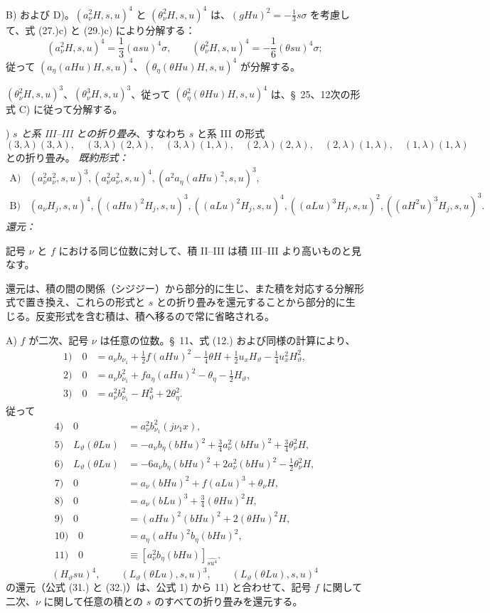 \documentclass[11pt]{jlreq}
\begin{document}
B) および D)。$(a_\nu^2H,s,u)^4$ と $(\theta_\nu^2H,s,u)^4$ は、$(gHu)^2=-\frac13s\sigma$ を考慮して、式 (27.)c) と (29.)c) により分解する：
\[
(a_\nu^2H,s,u)^4=\frac13(asu)^4\sigma,
\qquad
(\theta_\nu^2H,s,u)^4=-\frac16(\theta su)^4\sigma;
\]
従って $(a_\eta(aHu)H,s,u)^4$、$(\theta_\eta(\theta Hu)H,s,u)^4$ が分解する。

$(\theta_\nu^2H,s,u)^3$、$(\theta_\nu^3H,s,u)^3$、従って $(\theta_\eta^2(\theta Hu)H,s,u)^4$ は、\S\ 25、12次の形式 C) に従って分解する。

) \emph{$s$ と系 III--III との折り畳み}、すなわち $s$ と系 III の形式
\[
(3,\lambda)(3,\lambda),\quad (3,\lambda)(2,\lambda),\quad (3,\lambda)(1,\lambda),\quad
(2,\lambda)(2,\lambda),\quad (2,\lambda)(1,\lambda),\quad (1,\lambda)(1,\lambda)
\]
との折り畳み。
\noindent\emph{既約形式：}
\[
\begin{array}{rl}
\text{A)}&(a_\nu^2a_\nu^2,s,u)^3,
(a_\nu^2a_\nu^2,s,u)^4,
(a^2a_\eta(aHu)^2,s,u)^3,\\[0.3em]
\text{B)}&(a_\nu H_j,s,u)^4,
((aHu)^2H_j,s,u)^3,
((aLu)^2H_j,s,u)^4,
((aLu)^3H_j,s,u)^2,
((aH^2u)^3H_j,s,u)^3.
\end{array}
\]
\noindent\emph{還元：}

記号 $\nu$ と $f$ における同じ位数に対して、積 II--III は積 III--III より高いものと見なす。

還元は、積の間の関係（シジジー）から部分的に生じ、また積を対応する分解形式で置き換え、これらの形式と $s$ との折り畳みを還元することから部分的に生じる。反変形式を含む積は、積へ移るので常に省略される。

A) $f$ が二次、記号 $\nu$ は任意の位数。\S\ 11、式 (12.) および同様の計算により、
\begin{align*}
1)\quad 0&=a_\nu b_{\nu_1}+\frac12f(aHu)^2-\frac14\theta H+\frac12u_xH_\vartheta-\frac14u_x^2H_\vartheta^2,\\
2)\quad 0&=a_\nu b_{\nu_1}^2+f a_\eta(aHu)^2-\theta_\eta-\frac12H_\vartheta,\\
3)\quad 0&=a_\nu^2b_{\nu_1}^2-H_\vartheta^2+2\theta_\eta^2.
\end{align*}
従って
\begin{align*}
4)\quad 0&=a_\nu^2b_{\nu_1}^2(j\nu_1x),\\
5)\quad L_\vartheta(\theta Lu)&=-a_\nu b_\eta(bHu)^2+\frac34a_\nu^2(bHu)^2+\frac34\theta_\nu^2H,\\
6)\quad L_\vartheta(\theta Lu)&=-6a_\nu b_\eta(bHu)^2+2a_\nu^2(bHu)^2-\frac12\theta_\nu^2H,\\
7)\quad 0&=a_\nu(bHu)^2+f(aLu)^3+\theta_\nu H,\\
8)\quad 0&=a_\nu(bLu)^3+\frac34(\theta Hu)^2H,\\
9)\quad 0&=(aHu)^2(bHu)^2+2(\theta Hu)^2H,\\
10)\quad 0&=a_\eta(aHu)^2b_\eta(bHu)^2,\\
11)\quad 0&\equiv [a_\nu^2b_\eta(bHu)]_{\widehat{su^4}}.
\end{align*}
\[
(H_\vartheta su)^4,
\qquad (L_\vartheta(\theta Lu),s,u)^3,
\qquad (L_\vartheta(\theta Lu),s,u)^4
\]
の還元（公式 (31.) と (32.)）は、公式 1) から 11) と合わせて、記号 $f$ に関して二次、$\nu$ に関して任意の積との $s$ のすべての折り畳みを還元する。
\end{document}
